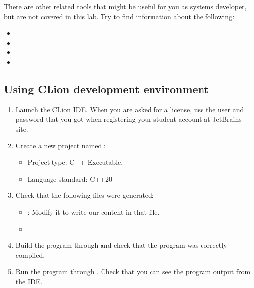 There are other related tools that might be useful for you as systems developer, but are not
covered in this lab. Try to find information about the following:

\begin{itemize}
  \item {}
  \item {}
  \item {}
  \item {}
\end{itemize}

\subsection{Using \textbf{CLion} development environment}

\begin{enumerate}

\item
Launch the CLion IDE.
When you are asked for a license, use the user and password
that you got when registering your student account at JetBrains site.

\item
Create a new project named :

\begin{itemize}
  \item Project type: C++ Executable.
  \item Language standard: C++20
\end{itemize}

\item
Check that the following files were generated:

\begin{itemize}
  \item {}: Modify it to write our  content in that file.
  \item {}
\end{itemize}

\item
Build the program through  and check that the program was correctly compiled.

\item
Run the program through . Check that you can see the program output from the IDE.

\end{enumerate}

